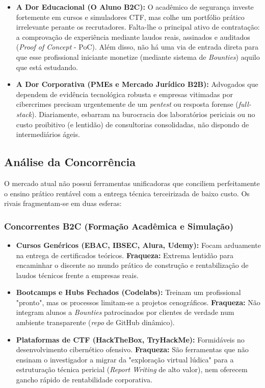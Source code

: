 \documentclass[../main.tex]{subfiles}
\begin{document}
\begin{itemize}
    \item \textbf{A Dor Educacional (O Aluno B2C):} O acadêmico de segurança investe fortemente em cursos e simuladores CTF, mas colhe um portfólio prático irrelevante perante os recrutadores. Falta-lhe o principal ativo de contratação: a comprovação de experiência mediante laudos reais, assinados e auditados (\textit{Proof of Concept} - PoC). Além disso, não há uma via de entrada direta para que esse profissional iniciante monetize (mediante sistema de \textit{Bounties}) aquilo que está estudando.
    \item \textbf{A Dor Corporativa (PMEs e Mercado Jurídico B2B):} Advogados que dependem de evidência tecnológica robusta e empresas vitimadas por cibercrimes precisam urgentemente de um \textit{pentest} ou resposta forense (\textit{full-stack}). Diariamente, esbarram na burocracia dos laboratórios periciais ou no custo proibitivo (e lentidão) de consultorias consolidadas, não dispondo de intermediários ágeis.
\end{itemize}

\subsection{Análise da Concorrência}

O mercado atual não possui ferramentas unificadoras que conciliem perfeitamente o ensino prático rentável com a entrega técnica terceirizada de baixo custo. Os rivais fragmentam-se em duas esferas:

\subsubsection{Concorrentes B2C (Formação Acadêmica e Simulação)}
\begin{itemize}
    \item \textbf{Cursos Genéricos (EBAC, IBSEC, Alura, Udemy):} Focam arduamente na entrega de certificados teóricos. \textbf{Fraqueza:} Extrema lentidão para encaminhar o discente ao mundo prático de construção e rentabilização de laudos técnicos frente a empresas reais.
    \item \textbf{Bootcamps e Hubs Fechados (Codelabs):} Treinam um profissional "pronto", mas os processos limitam-se a projetos cenográficos. \textbf{Fraqueza:} Não integram alunos a \textit{Bounties} patrocinados por clientes de verdade num ambiente transparente (\textit{repo} de GitHub dinâmico).
    \item \textbf{Plataformas de CTF (HackTheBox, TryHackMe):} Formidáveis no desenvolvimento cibernético ofensivo. \textbf{Fraqueza:} São ferramentas que não ensinam o investigador a migrar da "exploração virtual lúdica" para a estruturação técnica pericial (\textit{Report Writing} de alto valor), nem oferecem gancho rápido de rentabilidade corporativa.
\end{itemize}
\end{document}
